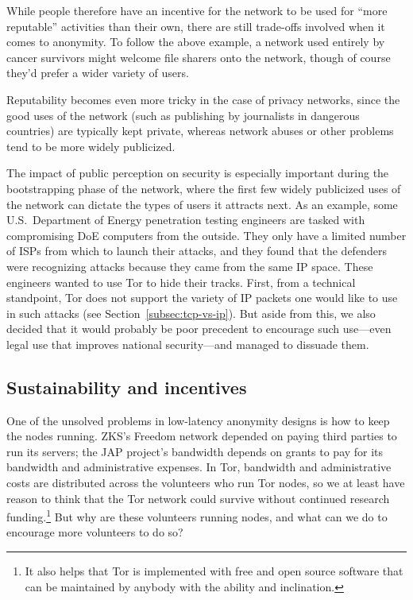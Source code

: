 \documentclass{llncs}
\begin{document}
While people therefore have an incentive for the network to be used for
``more reputable'' activities than their own, there are still trade-offs
involved when it comes to anonymity. To follow the above example, a
network used entirely by cancer survivors might welcome file sharers
onto the network, though of course they'd prefer a wider
variety of users.

Reputability becomes even more tricky in the case of privacy networks,
since the good uses of the network (such as publishing by journalists in
dangerous countries) are typically kept private, whereas network abuses
or other problems tend to be more widely publicized.

The impact of public perception on security is especially important
during the bootstrapping phase of the network, where the first few
widely publicized uses of the network can dictate the types of users it
attracts next.
As an example, some U.S.~Department of Energy
penetration testing engineers are tasked with compromising DoE computers
from the outside. They only have a limited number of ISPs from which to
launch their attacks, and they found that the defenders were recognizing
attacks because they came from the same IP space. These engineers wanted
to use Tor to hide their tracks. First, from a technical standpoint,
Tor does not support the variety of IP packets one would like to use in
such attacks (see Section~\ref{subsec:tcp-vs-ip}). But aside from this,
we also decided that it would probably be poor precedent to encourage
such use---even legal use that improves national security---and managed
to dissuade them.


\subsection{Sustainability and incentives}
One of the unsolved problems in low-latency anonymity designs is
how to keep the nodes running.  ZKS's Freedom network
depended on paying third parties to run its servers; the JAP project's
bandwidth depends on grants to pay for its bandwidth and
administrative expenses.  In Tor, bandwidth and administrative costs are
distributed across the volunteers who run Tor nodes, so we at least have
reason to think that the Tor network could survive without continued research
funding.\footnote{It also helps that Tor is implemented with free and open
  source software that can be maintained by anybody with the ability and
  inclination.}  But why are these volunteers running nodes, and what can we
do to encourage more volunteers to do so?
\end{document}
